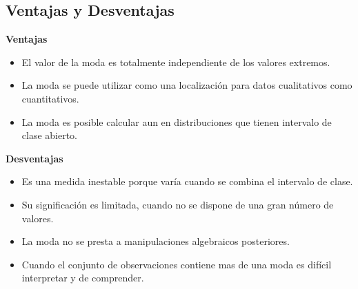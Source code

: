 \subsection{Ventajas y Desventajas}
\begin{multicols}{2}
\noindent
\textbf{Ventajas}
\begin{itemize}
\item El valor de la moda es totalmente independiente de los valores extremos.
\item La moda se puede utilizar como una localización para datos cualitativos como cuantitativos.
\item La moda es posible calcular aun en distribuciones que tienen intervalo de clase abierto.
\end{itemize}
\columnbreak
\noindent
\textbf{Desventajas}
\begin{itemize}
\item Es una medida inestable porque varía cuando se combina el intervalo de clase.
\item Su significación es limitada, cuando no se dispone de una gran número de valores.
\item La moda no se presta a manipulaciones algebraicos posteriores.
\item Cuando el conjunto de observaciones contiene mas de una moda es difícil interpretar y de comprender.
\end{itemize}
\end{multicols}
